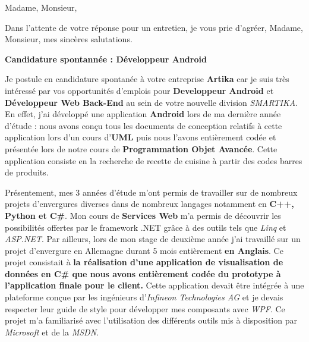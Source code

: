\date{\today}
\opening{Madame, Monsieur,}
\closing{Dans l'attente de votre réponse pour un entretien, je vous prie d'agréer, Madame, Monsieur, mes sincères salutations.}

\makelettertitle

\textbf{Candidature spontannée : Développeur Android}

\introduction{}
Je postule en candidature spontanée à votre entreprise \textbf{Artika} car je suis très intéressé par vos opportunités d'emplois pour \textbf{Developpeur Android} et \textbf{Développeur Web Back-End} au sein de votre nouvelle division \textit{SMARTIKA}. En effet, j'ai développé une application \textbf{Android} lors de ma dernière année d'étude : nous avons conçu tous les documents de conception relatifs à cette application lors d'un cours d'\textbf{UML} puis nous l'avons entièrement codée et présentée lors de notre cours de \textbf{Programmation Objet Avancée}. Cette application consiste en la recherche de recette de cuisine à partir des codes barres de produits.

Présentement, mes 3 années d'étude m'ont permis de travailler sur de nombreux projets d'envergures diverses dans de nombreux langages notamment en \textbf{C++, Python et C\#}. Mon cours de \textbf{Services Web} m'a permis de découvrir les possibilités offertes par le framework .NET grâce à des outils tels que \textit{Linq} et \textit{ASP.NET}. Par ailleurs, lors de mon stage de deuxième année j'ai travaillé sur un projet d'envergure en Allemagne durant 5 mois entièrement \textbf{en Anglais}. Ce projet consistait à \textbf{la réalisation d'une application de visualisation de données en C\# que nous avons entièrement codée du prototype à l'application finale pour le client.} Cette application devait être intégrée à une plateforme conçue par les ingénieurs d'\textit{Infineon Technologies AG} et je devais respecter leur guide de style pour développer mes composants avec \textit{WPF}. Ce projet m'a familiarisé avec l'utilisation des différents outils mis à disposition par \textit{Microsoft} et de la \textit{MSDN}.

